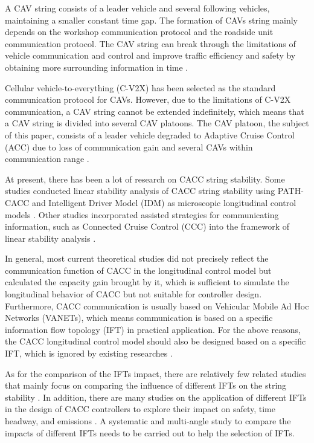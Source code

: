 \documentclass[journal]{IEEEtran}
\begin{document}
A CAV string consists of a leader vehicle and several following vehicles, maintaining a smaller constant time gap. The formation of CAVs string mainly depends on the workshop communication protocol and the roadside unit communication protocol. The CAV string can break through the limitations of vehicle communication and control and improve traffic efficiency and safety by obtaining more surrounding information in time \citep{hall2005vehicle}.


Cellular vehicle-to-everything (C-V2X) has been selected as the standard communication protocol for CAVs. However, due to the limitations of C-V2X communication, a CAV string cannot be extended indefinitely, which means that a CAV string is divided into several CAV platoons. The CAV platoon, the subject of this paper, consists of a leader vehicle degraded to Adaptive Cruise Control (ACC) due to loss of communication gain and several CAVs within communication range \citep{ruan2021stability}. 


At present, there has been a lot of research on CACC string stability. Some studies conducted linear stability analysis of CACC string stability using PATH-CACC and Intelligent Driver Model (IDM) as microscopic longitudinal control models \citep{qin2021lighthill,zhou2021impact}. Other studies incorporated assisted strategies for communicating information, such as Connected Cruise Control (CCC) into the framework of linear stability analysis \citep{zhang2020control,navas2019mixing}.


In general, most current theoretical studies did not precisely reflect the communication function of CACC in the longitudinal control model but calculated the capacity gain brought by it, which is sufficient to simulate the longitudinal behavior of CACC but not suitable for controller design. Furthermore, CACC communication is usually based on Vehicular Mobile Ad Hoc Networks (VANETs), which means communication is based on a specific information flow topology (IFT) in practical application. For the above reasons, the CACC longitudinal control model should also be designed based on a specific IFT, which is ignored by existing researches \citep{wang2020cooperative,li2020distributed,zhou2020smooth}.

As for the comparison of the IFTs impact, there are relatively few related studies that mainly focus on comparing the influence of different IFTs on the string stability \citep{zheng2015stability,zheng2017platooning}. In addition, there are many studies on the application of different IFTs in the design of CACC controllers to explore their impact on safety, time headway, and emissions \citep{bian2019reducing,liu2018modeling,yang2021cooperative}. A systematic and multi-angle study to compare the impacts of different IFTs needs to be carried out to help the selection of IFTs.
\end{document}
